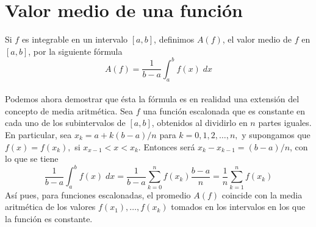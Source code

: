\begin{comment}
    \item Sea $V(q)$ el voltaje necesario para situar una carga $q$ en las placas de un condensador. El trabajo necesario para cargar un condensador desde $q=a$ hasta $q=b$ se define mediante la integral $\int_a^b V(q)\; dx$. Si el voltaje es proporcional a la carga, demostrar que el trabajo realizado para situar una carga $Q$ es un condensador descargado $\frac{1}{2}QV(Q)$.\\\\
	Demostración.-\; Ya que asumimos que el voltaje es proporcional a la carga, tenemos $V(q)=cq$ para alguna constante $c$, entonces,
	$$\begin{array}{rcl}
	    W&=&\displaystyle\int_a^b V(q)\; dq\\\\
	    &=&\displaystyle\int_a^b cq\; dq\\\\
	    &=&c\dfrac{q^2}{2}\bigg|_a^b\\\\
	    &=&\dfrac{1}{2}\left[cv(b)-cv(a)\right]\\\\
	    &=&\dfrac{1}{2}QV(Q)\\\\
	\end{array}$$
    
\end{enumerate}

\end{comment}

\section{Valor medio de una función}

\begin{tcolorbox}[colback = white]
    \begin{def.}
	Si $f$ es integrable en un intervalo $[a,b]$, definimos $A(f)$, el valor medio de $f$ en $[a,b]$, por la siguiente fórmula
	$$A(f) = \dfrac{1}{b-a} \int_a^b f(x) \; dx$$\\
    Podemos ahora demostrar que ésta la fórmula es en realidad una extensión del concepto de media aritmética. Sea $f$ una función escalonada que es constante en cada uno de los subintervalos de $[a,b]$, obtenidos al dividirlo en $n$ partes iguales. En particular, sea $x_k=a+k(b-a)/n$ para $k=0,1,2,\ldots,n,$ y supongamos que $f(x)=f(x_k),$ si $x_{x-1}<x<x_k$. Entonces será $x_k - x_{k-1} = (b-a)/n$, con lo que se tiene
    $$\dfrac{1}{b-a}\int_a^b f(x)\; dx = \dfrac{1}{b-a}\sum_{k=0}^n f(x_k) \dfrac{b-a}{n} = \dfrac{1}{n} \sum_{k=1}^n f(x_k)$$
    Así pues, para funciones escalonadas, el promedio $A(f)$ coincide con la media aritmética de los valores $f(x_1),\ldots , f(x_k)$ tomados en los intervalos en los que la función es constante.
    
    \end{def.}
\end{tcolorbox}


